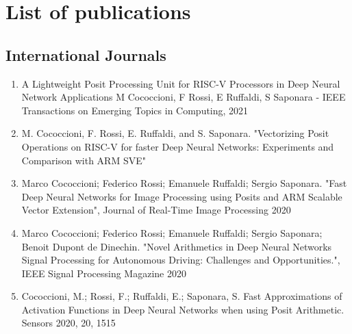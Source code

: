 \chapter*{List of publications}

\section*{International Journals}
\begin{enumerate}
    
    \item A Lightweight Posit Processing Unit for RISC-V Processors in Deep Neural Network Applications
M Cococcioni, F Rossi, E Ruffaldi, S Saponara - IEEE Transactions on Emerging Topics in Computing, 2021
    \item M. Cococcioni, F. Rossi, E. Ruffaldi, and S. Saponara. "Vectorizing Posit Operations on RISC-V for faster Deep Neural Networks: Experiments and Comparison with ARM SVE" 
    \item Marco Cococcioni; Federico Rossi; Emanuele Ruffaldi; Sergio Saponara. "Fast Deep Neural Networks for Image Processing using Posits and ARM Scalable Vector Extension", Journal of Real-Time Image Processing 2020 
    \item Marco Cococcioni; Federico Rossi; Emanuele Ruffaldi; Sergio Saponara; Benoit Dupont de Dinechin. "Novel Arithmetics in Deep Neural Networks Signal Processing for Autonomous Driving: Challenges and Opportunities.", IEEE Signal Processing Magazine 2020 
    \item Cococcioni, M.; Rossi, F.; Ruffaldi, E.; Saponara, S. Fast Approximations of Activation Functions in Deep Neural Networks when using Posit Arithmetic. Sensors 2020, 20, 1515 
\end{enumerate}

